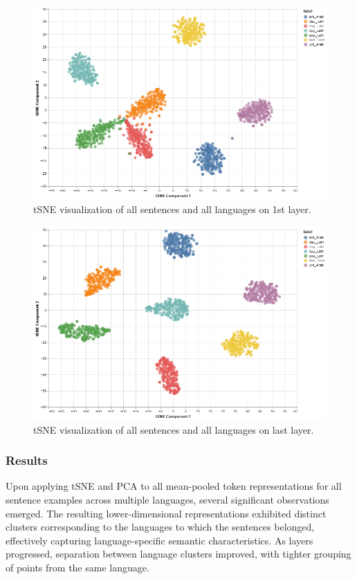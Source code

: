 \documentclass[11pt]{article}
\begin{document}
\begin{figure}[ht]
\centering
\includegraphics[width=0.9\columnwidth]{allSentenceLang_firstLayer_tsne.png}
\caption{tSNE visualization of all sentences and all languages on 1st layer.}
\end{figure}


\begin{figure}[ht]
\centering
\includegraphics[width=0.9\columnwidth]{allSentenceLang_lastLayer_tsne.png}
\caption{tSNE visualization of all sentences and all languages on last layer.}
\end{figure}

\subsubsection{Results}

Upon applying tSNE and PCA to all mean-pooled token representations for all sentence examples across multiple languages, several significant observations emerged. The resulting lower-dimensional representations exhibited distinct clusters corresponding to the languages to which the sentences belonged, effectively capturing language-specific semantic characteristics. As layers progressed, separation between language clusters improved, with tighter grouping of points from the same language.
\end{document}
